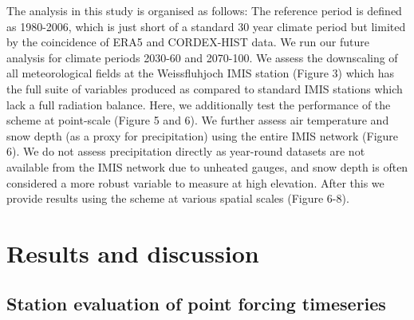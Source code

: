 \documentclass[hess, manuscript]{copernicus}
\begin{document}
 The analysis in this study is organised as follows: The reference period is defined as 1980-2006, which is just short of a standard 30 year climate period but limited by the coincidence of ERA5 and CORDEX-HIST data. We run our future analysis for climate periods 2030-60 and 2070-100. We assess the downscaling of all meteorological fields at the Weissfluhjoch IMIS station (Figure 3) which has the full suite of variables produced as compared to standard IMIS stations which lack a full radiation balance. Here, we additionally test the performance of the scheme at point-scale (Figure 5 and 6). We further assess air temperature and snow depth (as a proxy for precipitation) using the entire IMIS network (Figure 6). We do not assess precipitation directly as year-round datasets are not available from the IMIS network due to unheated gauges, and snow depth is often considered a more robust variable to measure at high elevation. After this we provide results using the scheme at various spatial scales (Figure 6-8).
 

 

\section{Results and discussion}


\subsection{Station evaluation of point forcing timeseries}
\end{document}
